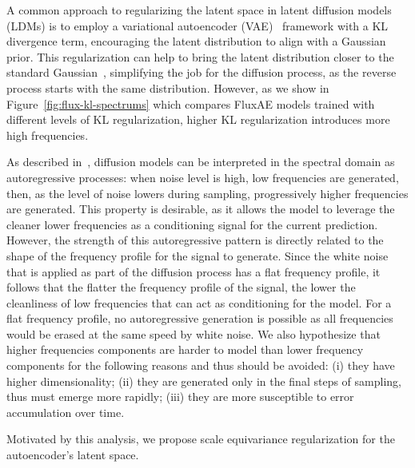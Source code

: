 A common approach to regularizing the latent space in latent diffusion models (LDMs) is to employ a variational autoencoder (VAE)~\cite{VAE} framework with a KL divergence term, encouraging the latent distribution to align with a Gaussian prior. This regularization can help to bring the latent distribution closer to the standard Gaussian~\cite{LSGM}, simplifying the job for the diffusion process, as the reverse process starts with the same distribution. However, as we show in Figure~\ref{fig:flux-kl-spectrums} which compares FluxAE models trained with different levels of KL regularization, higher KL regularization introduces more high frequencies.

As described in~\cite{DCTdiff, spectral-autoregression, InverseHeatDissipation}, diffusion models can be interpreted in the spectral domain as autoregressive processes: when noise level is high, low frequencies are generated, then, as the level of noise lowers during sampling, progressively higher frequencies are generated. This property is desirable, as it allows the model to leverage the cleaner lower frequencies as a conditioning signal for the current prediction.  %
However, the strength of this autoregressive pattern is directly related to the shape of the frequency profile for the signal to generate. Since the white noise that is applied as part of the diffusion process has a flat frequency profile, it follows that the flatter the frequency profile of the signal, the lower the cleanliness of low frequencies that can act as conditioning for the model. For a flat frequency profile, no autoregressive generation is possible as all frequencies would be erased at the same speed by white noise.
We also hypothesize that higher frequencies components are harder to model than lower frequency components for the following reasons and thus should be avoided: (i) they have higher dimensionality; (ii) they are generated only in the final steps of sampling, thus must emerge more rapidly; (iii) they are more susceptible to error accumulation over time.

Motivated by this analysis, we propose scale equivariance regularization for the autoencoder's latent space.

